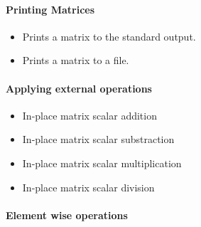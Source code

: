 \paragraph{Printing Matrices}

\begin{itemize}
\item {}
  \sshortdescribe Prints a matrix to the standard output.  

\item {}
  \sshortdescribe Prints a matrix to a file.
\end{itemize}

\paragraph{Applying external operations}
\begin{itemize}
\item {}
  \sshortdescribe In-place matrix scalar addition  

\item {}
  \sshortdescribe In-place matrix scalar substraction  

\item {}
  \sshortdescribe In-place matrix scalar multiplication  

\item {}
  \sshortdescribe In-place matrix scalar division  

\end{itemize}

\paragraph{Element wise operations}


